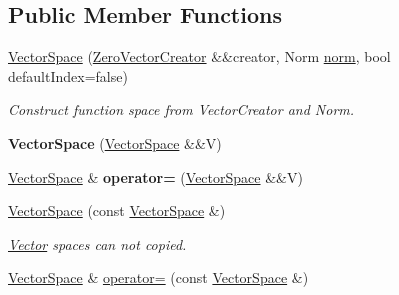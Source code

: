 \subsection*{\-Public \-Member \-Functions}
\begin{DoxyCompactItemize}
\item 
\hyperlink{classSpacy_1_1VectorSpace_aa4f30986a1b977cf7f0abc27e0c9872d}{\-Vector\-Space} (\hyperlink{classSpacy_1_1ZeroVectorCreator}{\-Zero\-Vector\-Creator} \&\&creator, \-Norm \hyperlink{classSpacy_1_1VectorSpace_a2f26e33994544a37a83e6938a748ab8c}{norm}, bool default\-Index=false)
\begin{DoxyCompactList}\small\item\em \-Construct function space from \-Vector\-Creator and \-Norm. \end{DoxyCompactList}\item 
\hypertarget{classSpacy_1_1VectorSpace_a2bc6444dc35de9fe68d7a8156c03125f}{{\bfseries \-Vector\-Space} (\hyperlink{classSpacy_1_1VectorSpace}{\-Vector\-Space} \&\&\-V)}\label{classSpacy_1_1VectorSpace_a2bc6444dc35de9fe68d7a8156c03125f}

\item 
\hypertarget{classSpacy_1_1VectorSpace_a5c43f6cca9f16ee3839e813633f87370}{\hyperlink{classSpacy_1_1VectorSpace}{\-Vector\-Space} \& {\bfseries operator=} (\hyperlink{classSpacy_1_1VectorSpace}{\-Vector\-Space} \&\&\-V)}\label{classSpacy_1_1VectorSpace_a5c43f6cca9f16ee3839e813633f87370}

\item 
\hypertarget{classSpacy_1_1VectorSpace_aa3d4d9cb23cd961cb6a2afc148cdf2ac}{\hyperlink{classSpacy_1_1VectorSpace_aa3d4d9cb23cd961cb6a2afc148cdf2ac}{\-Vector\-Space} (const \hyperlink{classSpacy_1_1VectorSpace}{\-Vector\-Space} \&)}\label{classSpacy_1_1VectorSpace_aa3d4d9cb23cd961cb6a2afc148cdf2ac}

\begin{DoxyCompactList}\small\item\em \hyperlink{classSpacy_1_1Vector}{\-Vector} spaces can not copied. \end{DoxyCompactList}\item 
\hypertarget{classSpacy_1_1VectorSpace_a775302f5c4a9bb45766898d5f01470c2}{\hyperlink{classSpacy_1_1VectorSpace}{\-Vector\-Space} \& \hyperlink{classSpacy_1_1VectorSpace_a775302f5c4a9bb45766898d5f01470c2}{operator=} (const \hyperlink{classSpacy_1_1VectorSpace}{\-Vector\-Space} \&)}\label{classSpacy_1_1VectorSpace_a775302f5c4a9bb45766898d5f01470c2}


\end{DoxyCompactItemize}

